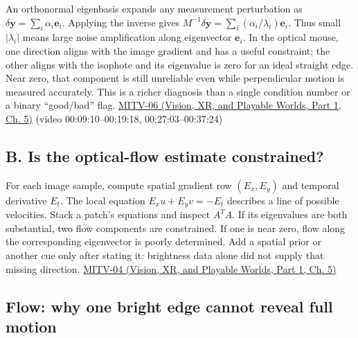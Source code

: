 An orthonormal eigenbasis expands any measurement perturbation as \(\delta\mathbf y=\sum_i \alpha_i\mathbf e_i\). Applying the inverse gives \(M^{-1}\delta\mathbf y=\sum_i (\alpha_i/\lambda_i)\mathbf e_i\). Thus small \(|\lambda_i|\) means large noise amplification along eigenvector \(\mathbf e_i\). In the optical mouse, one direction aligns with the image gradient and has a useful constraint; the other aligns with the isophote and its eigenvalue is zero for an ideal straight edge. Near zero, that component is still unreliable even while perpendicular motion is measured accurately. This is a richer diagnosis than a single condition number or a binary ``good/bad'' flag. \href{../07-Vision-XR-and-Playable-Worlds-P01/main.pdf\#nameddest=04-visual-computing-ii-ch036-mitv-06---photometric-stereo-noise-gain-error-amplification-eigenvalues-and-eigenvectors-review}{MITV-06 (Vision, XR, and Playable Worlds, Part 1, Ch. 5)} (video 00:09:10--00:19:18, 00:27:03--00:37:24)

\subsection{B. Is the optical-flow estimate constrained?}\label{04-visual-computing-ii-ch030-b.-is-the-optical-flow-estimate-constrained}

\hypertarget{04-visual-computing-ii-ch030-b.-is-the-optical-flow-estimate-constrained}{}

For each image sample, compute spatial gradient row \((E_x,E_y)\) and temporal derivative \(E_t\). The local equation \(E_xu+E_yv=-E_t\) describes a line of possible velocities. Stack a patch's equations and inspect \(A^TA\). If its eigenvalues are both substantial, two flow components are constrained. If one is near zero, flow along the corresponding eigenvector is poorly determined. Add a spatial prior or another cue only after stating it: brightness data alone did not supply that missing direction. \href{../07-Vision-XR-and-Playable-Worlds-P01/main.pdf\#nameddest=04-visual-computing-ii-ch036-mitv-04---fixed-optical-flow-optical-mouse-constant-brightness-assumption-closed-form-solution}{MITV-04 (Vision, XR, and Playable Worlds, Part 1, Ch. 5)}

\subsection{Flow: why one bright edge cannot reveal full motion}\label{04-visual-computing-ii-ch030-flow-why-one-bright-edge-cannot-reveal-full-motion}

